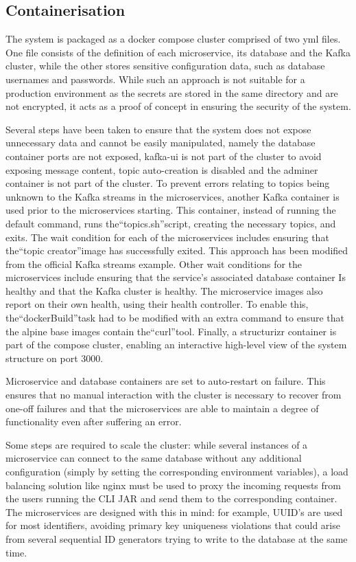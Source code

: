 \documentclass[parskip=full]{article}
\begin{document}
    \pagebreak
    \subsection{Containerisation}
    The system is packaged as a docker compose cluster comprised of two yml files.
    One file consists of the definition of each microservice, its database and the Kafka cluster, while the other stores sensitive configuration data, such as database usernames and passwords.
    While such an approach is not suitable for a production environment as the secrets are stored in the same directory and are not encrypted, it acts as a proof of concept in ensuring the security of the system.

Several steps have been taken to ensure that the system does not expose unnecessary data and cannot be easily manipulated, namely the database container ports are not exposed, kafka-ui is not part of the cluster to avoid exposing message content, topic auto-creation is disabled and the adminer container is not part of the cluster.
To prevent errors relating to topics being unknown to the Kafka streams in the microservices, another Kafka container is used prior to the microservices starting.
This container, instead of running the default command, runs the``topics.sh''script, creating the necessary topics, and exits.
The wait condition for each of the microservices includes ensuring that the``topic creator''image has successfully exited.
This approach has been modified from the official Kafka streams example.
Other wait conditions for the microservices include ensuring that the service's associated database container Is healthy and that the Kafka cluster is healthy.
The microservice images also report on their own health, using their health controller.
To enable this, the``dockerBuild''task had to be modified with an extra command to ensure that the alpine base images contain the``curl''tool.
Finally, a structurizr container is part of the compose cluster, enabling an interactive high-level view of the system structure on port 3000.

Microservice and database containers are set to auto-restart on failure.
This ensures that no manual interaction with the cluster is necessary to recover from one-off failures and that the microservices are able to maintain a degree of functionality even after suffering an error.

Some steps are required to scale the cluster: while several instances of a microservice can connect to the same database without any additional configuration (simply by setting the corresponding environment variables), a load balancing solution like nginx must be used to proxy the incoming requests from the users running the CLI JAR and send them to the corresponding container.
The microservices are designed with this in mind: for example, UUID's are used for most identifiers, avoiding primary key uniqueness violations that could arise from several sequential ID generators trying to write to the database at the same time.
\end{document}
